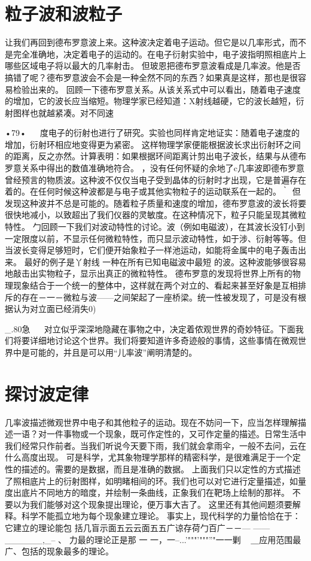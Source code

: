 \section{粒子波和波粒子}

让我们再回到德布罗意波上来。这种波决定着电子运动。但它是以几率形式，而不是完全准确地，决定着电子的运动的。在电子衍射实验中，电子波指明照相底片上哪些区域电子将以最大的几率射击。
但玻恩把德布罗意波看成是几率波。他是否搞错了呢？德布罗意波会不会是一种全然不同的东西？如果真是这样，那也是很容易检验出来的。
回顾一下德布罗意关系。从该关系式中可以看出，随着电子速度的增加，它的波长应当缩短。物理学家已经知道：X射线越硬，它的波长越短，衍射图样也就越紧凑。对不同速

•79•
  
度电子的衍射也进行了研究。实验也同样肯定地证实：随着电子速度的增加，衍射环相应地变得更为紧密。
这样物理学家便能根据波长求出衍射环之间的距离，反之亦然。计算表明：如果根据环间距离计剪出电子波长，结果与从德布罗意关系中得出的数值准确地符合。
，没有任何怀疑的余地了c几率波即德布罗意曾经预言的物质波。这种波不仅仅当电子受到晶体的衍射时才出现，它是普遍存在着的。在任何时候这种波都是与电子或其他实物粒子的运动联系在一起的。｀
但发现这种波并不总是可能的。随着粒子质量和速度的增加，德布罗意波的波长将要很快地减小，以致超出了我们仪器的灵敏度。在这种情况下，粒子只能呈现其微粒特性。
勹回顾一下我们对波动特性的讨论。波（例如电磁波），在其波长没钉小到一定限度以前，不显示任何微粒特性，而只显示波动特性，如于涉、衍射等等。但当波长变得足够短时，它们便开始象粒子一样池运动，如能将金属中的电子轰击出来。
	最好的例子是丫射线	一种在所有已知电磁波中最短
的波。这种波能够很容易地敲击出实物粒子，显示出真正的微粒特性。
德布罗意的发现将世界上所有的物理现象结合于一个统一的整体中，这样就在两个对立的、看起来甚至好象是互相排斥的存在－一－微粒与波——之间架起了一座桥梁。统一性被发现了，可是没有根据认为对立面已经消失0)

_.80急
  
对立似乎深深地隐藏在事物之中，决定着侬观世界的奇妙特征。下面我们将要详细地讨论这个世界。我们将要知道许多奇迹般的事情，这些事情在微观世界中是可能的，并且是可以用“儿率波”阐明清楚的。

\section{探讨波定律}
几率波描述微观世界中电子和其他粒子的运动。现在不妨问一下，应当怎样理解描述一语？对一件事物或一个现象，既可作定性的，又可作定量的描述。日常生活中我们经常只作前者。当我们听说今天要下雨，我们就会拿雨伞，一般不去问，云在什么高度出现。
可是科学，尤其象物理学那样的精密科学，是很难满足于一个定性的描述的。需要的是数据，而且是准确的数据。
上面我们只以定性的方式描述了照相底片上的衍射图样，如明睹相间的环。我们也可以对它进行定量描述，如量度出底片不同地方的暗度，并绘制一条曲线，正象我们在靶场上绘制的那祥。
不要以为我们能够对这个现象提出理论，便万事大吉了。
这里还有其他间题须要解释。科学不能孤立地为每个现象建立理论。
事实上，现代科学的力量恰恰在于：它建立的理论能包
	括几盲示面五云云面五五广谅存荷勹百广－－—	—---
______,_--
	、	力最的理论正是那
	一	一，一--...'"""'"""''"一一剿	~
＿应用范围最广、包括的现象最多的理论。


